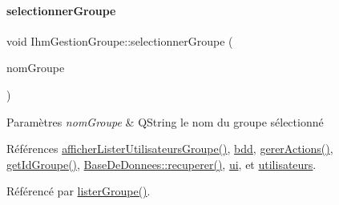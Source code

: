 \paragraph{\texorpdfstring{selectionner\+Groupe}{selectionnerGroupe}}
{\footnotesize\ttfamily void Ihm\+Gestion\+Groupe\+::selectionner\+Groupe (\begin{DoxyParamCaption}\item[{Q\+String}]{nom\+Groupe }\end{DoxyParamCaption})\hspace{0.3cm}{\ttfamily [slot]}}


\begin{DoxyParams}{Paramètres}
{\em nom\+Groupe} & Q\+String le nom du groupe sélectionné \\
\hline
\end{DoxyParams}


Références \hyperlink{class_ihm_gestion_groupe_a491098bb1e69aa1c09b76c3459da067f}{afficher\+Lister\+Utilisateurs\+Groupe()}, \hyperlink{class_ihm_gestion_groupe_a4f0049a7046abe7530d7f7eaed7ed2bc}{bdd}, \hyperlink{class_ihm_gestion_groupe_a9e6a325b8845fb3c22157b2b59436610}{gerer\+Actions()}, \hyperlink{class_ihm_gestion_groupe_a0f6dd8f645a5bf789521a25322004146}{get\+Id\+Groupe()}, \hyperlink{class_base_de_donnees_a77539baad389f5acf754cd2cd452403e}{Base\+De\+Donnees\+::recuperer()}, \hyperlink{class_ihm_gestion_groupe_a9785ad3dadc1d2cad8558ca8b682dffd}{ui}, et \hyperlink{class_ihm_gestion_groupe_a1f14e24cf672c5d0b6ae86084f758846}{utilisateurs}.



Référencé par \hyperlink{class_ihm_gestion_groupe_a7afabe81c405b35e7cfd4e760eda8c84}{lister\+Groupe()}.


